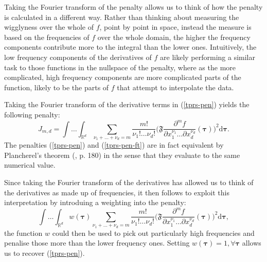 Taking the Fourier transform of the penalty allows us to think of how the penalty is calculated in a different way. Rather than thinking about measuring the wigglyness over the whole of $f$, point by point in space, instead the measure is based on the frequencies of $f$ over the whole domain, the higher the frequency components contribute more to the integral than the lower ones. Intuitively, the low frequency components of the derivatives of $f$ are likely performing a similar task to those functions in the nullspace of the penalty, where as the more complicated, high frequency components are more complicated parts of the function, likely to be the parts of $f$ that attempt to interpolate the data.

Taking the Fourier transform of the derivative terms in (\ref{tprs-pen}) yields the following penalty:
\begin{equation}
J_{m,d} = \int \ldots \int_{\mathbb{R}^d} \sum_{\nu_1 + \dots + \nu_d=m} \frac{m!}{\nu_1! \dots \nu_d!}\Big( \mathfrak{F} \frac{\partial^m f}{\partial x_1^{\nu_1} \ldots  \partial x_d^{\nu_d}}(\boldsymbol{\tau}) \Big)^2 \text{d} \boldsymbol{\tau}.
\label{tprs-pen-ft}
\end{equation}
The penalties (\ref{tprs-pen}) and (\ref{tprs-pen-ft}) are in fact equivalent by Plancherel's theorem (\cite{vretblad}, p. 180) in the sense that they evaluate to the same numerical value.

Since taking the Fourier transform of the derivatives has allowed us to think of the derivatives as made up of frequencies, it then follows to exploit this interpretation by introduing a weighting into the penalty: 
\begin{equation}
\int \ldots \int_{\mathbb{R}^d} w(\boldsymbol{\tau}) \sum_{\nu_1 + \dots + \nu_d=m} \frac{m!}{\nu_1! \dots \nu_d!}\Big( \mathfrak{F} \frac{\partial^m f}{\partial x_1^{\nu_1} \ldots  \partial x_d^{\nu_d}}(\boldsymbol{\tau}) \Big)^2 \text{d} \boldsymbol{\tau},
\label{duchon-penalty-general}
\end{equation}
the function $w$ could then be used to pick out particularly high frequencies and penalise those more than the lower frequency ones. Setting $w(\boldsymbol{\tau})=1, \forall \boldsymbol{\tau}$ allows us to recover (\ref{tprs-pen}).

